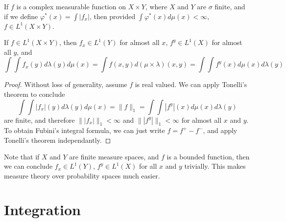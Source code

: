 \begin{corollary}
    If $f$ is a complex measurable function on $X \times Y$, where $X$ and $Y$ are $\sigma$ finite, and if we define $\varphi^*(x) = \int |f_x|$, then provided $\int \varphi^*(x) d\mu(x) < \infty$, $f \in L^1(X \times Y)$.
\end{corollary}

\begin{theorem}[Fubini]
    If $f \in L^1(X \times Y)$, then $f_x \in L^1(Y)$ for almost all $x$, $f^y \in L^1(X)$ for almost all $y$, and
    \[ \int \int f_x(y) d\lambda(y) d\mu(x) = \int f(x,y) d(\mu \times \lambda)(x,y) = \int \int f^y(x) d\mu(x) d\lambda(y) \]
\end{theorem}
\begin{proof}
    Without loss of generality, assume $f$ is real valued. We can apply Tonelli's theorem to conclude
    \[ \int \int |f_x|(y) d\lambda(y) d\mu(x) = \| f \|_1 = \int \int |f^y|(x) d\mu(x) d\lambda(y) \]
    are finite, and therefore $\| |f_x| \|_1 < \infty$ and $\| |f^y| \|_1 < \infty$ for almost all $x$ and $y$. To obtain Fubini's integral formula, we can just write $f = f^+ - f^-$, and apply Tonelli's theorem independantly.
\end{proof}

Note that if $X$ and $Y$ are finite measure spaces, and $f$ is a bounded function, then we can conclude $f_x \in L^1(Y)$, $f^y \in L^1(X)$ for all $x$ and $y$ trivially. This makes measure theory over probability spaces much easier.

\chapter{Integration}

